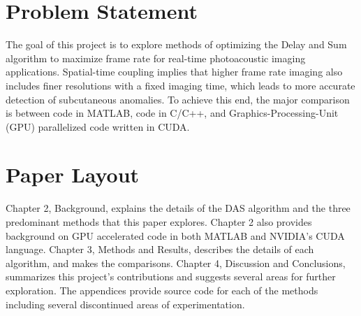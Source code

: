 \section{Problem Statement}
\label{chapter1:problem_statement}

The goal of this project is to explore methods of optimizing the Delay and Sum algorithm to maximize frame rate for real-time photoacoustic imaging applications. Spatial-time coupling implies that higher frame rate imaging also includes finer resolutions with a fixed imaging time, which leads to more accurate detection of subcutaneous anomalies. To achieve this end, the major comparison is between code in MATLAB, code in C/C++, and Graphics-Processing-Unit (GPU) parallelized code written in CUDA.

\section{Paper Layout}
\label{chapter1:layout}

Chapter 2, Background, explains the details of the DAS algorithm and the three predominant methods that this paper explores. Chapter 2 also provides background on GPU accelerated code in both MATLAB and NVIDIA's CUDA language. Chapter 3, Methods and Results, describes the details of each algorithm, and makes the comparisons. Chapter 4, Discussion and Conclusions, summarizes this project's contributions and suggests several areas for further exploration. The appendices provide source code for each of the methods including several discontinued areas of experimentation.
